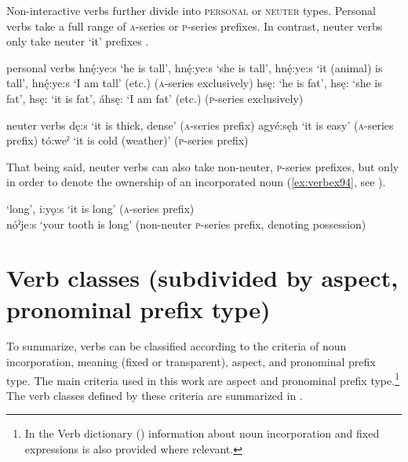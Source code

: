 Non-interactive verbs  further divide into \textsc{personal} or \textsc{neuter} types. Personal verbs take a full range of \textsc{a}-series  or \textsc{p}-series  prefixes. In contrast, neuter verbs only take neuter ‘it’ prefixes . 


\ea\label{ex:verbex920} personal verbs 
\ea\label{ex:verbex920a} hnę́:ye:s ‘he is tall’, hnę́:ye:s ‘she is tall’, hnę́:ye:s ‘it (animal) is tall’, hnę́:ye:s ‘I am tall’ (etc.) (\textsc{a}-series exclusively)
\ex\label{ex:verbex920b} hsę: ‘he is fat’, hsę: ‘she is fat’, hsę: ‘it is fat’, áhsę: ‘I am fat’ (etc.) (\textsc{p}-series exclusively)
\z
\z


\ea\label{ex:verbex930} neuter verbs 
\ea {}dę:s ‘it is thick, dense’ (\textsc{a}-series prefix)
\ex {}agyé:sęh ‘it is easy’ (\textsc{a}-series prefix)
\ex {}tó:weˀ ‘it is cold (weather)’ (\textsc{p}-series prefix)
\z
\z

That being said, neuter verbs can also take non-neuter, \textsc{p}-series prefixes, but only in order to denote the ownership of an incorporated noun (\ref{ex:verbex94}, see ). 


\ea\label{ex:verbex94}  ‘long’, i:yǫ:s ‘it is long’ (\textsc{a}-series prefix)\\
nóˀje:s ‘your tooth is long’ (non-neuter \textsc{p}-series prefix, denoting possession)
\z



\section{Verb classes (subdivided by aspect, pronominal prefix type)} \label{Verb classes (subdivided by aspect, pronominal prefix type)}
To summarize, verbs can be classified according to the criteria of noun incorporation, meaning (fixed or transparent), aspect, and pronominal prefix type. The main criteria used in this work are aspect and pronominal prefix type.\footnote{In the Verb dictionary () information about noun incorporation and fixed expressions is also provided where relevant.} The verb classes defined by these criteria are summarized in . 

